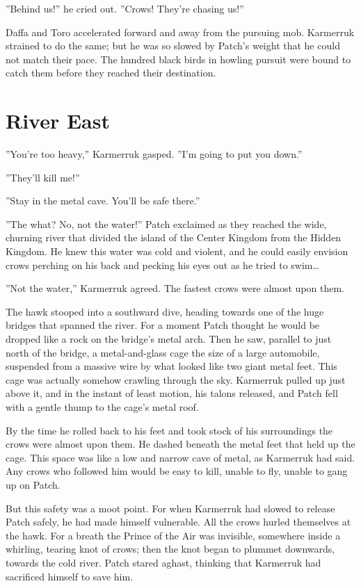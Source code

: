 \documentclass[12pt]{book}
\begin{document}
''Behind us!'' he cried out. ''Crows! They're chasing us!''

Daffa and Toro accelerated forward and away from the pursuing
mob. Karmerruk strained to do the same; but he was so slowed by
Patch's weight that he could not match their pace. The hundred black
birds in howling pursuit were bound to catch them before they reached
their destination.


\section{River East}

''You're too heavy,'' Karmerruk gasped. ''I'm going to put you down.''

''They'll kill me!''

''Stay in the metal cave. You'll be safe there.''

''The what? No, not the water!'' Patch exclaimed as they reached the
wide, churning river that divided the island of the Center Kingdom
from the Hidden Kingdom. He knew this water was cold and violent, and
he could easily envision crows perching on his back and pecking his
eyes out as he tried to swim\ldots{}

''Not the water,'' Karmerruk agreed. The fastest crows were almost
upon them.

The hawk stooped into a southward dive, heading towards one of the
huge bridges that spanned the river. For a moment Patch thought he
would be dropped like a rock on the bridge's metal arch. Then he saw,
parallel to just north of the bridge, a metal-and-glass cage the size
of a large automobile, suspended from a massive wire by what looked
like two giant metal feet. This cage was actually somehow crawling
through the sky. Karmerruk pulled up just above it, and in the instant
of least motion, his talons released, and Patch fell with a gentle
thump to the cage's metal roof.

By the time he rolled back to his feet and took stock of his
surroundings the crows were almost upon them. He dashed beneath the
metal feet that held up the cage. This space was like a low and narrow
cave of metal, as Karmerruk had said. Any crows who followed him would
be easy to kill, unable to fly, unable to gang up on Patch.

But this safety was a moot point. For when Karmerruk had slowed to
release Patch safely, he had made himself vulnerable. All the crows
hurled themselves at the hawk. For a breath the Prince of the Air was
invisible, somewhere inside a whirling, tearing knot of crows; then
the knot began to plummet downwards, towards the cold river. Patch
stared aghast, thinking that Karmerruk had sacrificed himself to save
him.
\end{document}
